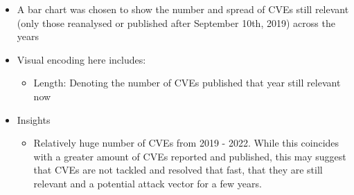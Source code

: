 \documentclass[a4paper, 11pt]{article}
\begin{document}
\begin{itemize}
\item A bar chart was chosen to show the number and spread of CVEs still relevant (only those reanalysed or published after September 10th, 2019) across the years
\item Visual encoding here includes:
\begin{itemize}
\item Length: Denoting the number of CVEs published that year still relevant now
\end{itemize}
\item Insights
\begin{itemize}
\item Relatively huge number of CVEs from 2019 - 2022. While this coincides with a greater amount of CVEs reported and published, this may suggest that CVEs are not tackled and resolved that fast, that they are still relevant and a potential attack vector for a few years.
\end{itemize}
\end{itemize}
\end{document}
